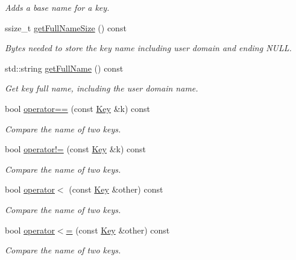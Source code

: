 \begin{DoxyCompactItemize}
\begin{DoxyCompactList}\small\item\em Adds a base name for a key. \end{DoxyCompactList}\item 
ssize\+\_\+t \hyperlink{classkdb_1_1Key_a4b5c13b86402dffa0845a6044cd57b39}{get\+Full\+Name\+Size} () const 
\begin{DoxyCompactList}\small\item\em Bytes needed to store the key name including user domain and ending N\+U\+L\+L. \end{DoxyCompactList}\item 
std\+::string \hyperlink{classkdb_1_1Key_ab94686ea0b459e5a383942ec322d9c6e}{get\+Full\+Name} () const 
\begin{DoxyCompactList}\small\item\em Get key full name, including the user domain name. \end{DoxyCompactList}\item 
bool \hyperlink{classkdb_1_1Key_abaff8356eb91a6d3aed2b6d282269da2}{operator==} (const \hyperlink{classkdb_1_1Key}{Key} \&k) const 
\begin{DoxyCompactList}\small\item\em Compare the name of two keys. \end{DoxyCompactList}\item 
bool \hyperlink{classkdb_1_1Key_a313a84b686a72769ecf4c368a79d492c}{operator!=} (const \hyperlink{classkdb_1_1Key}{Key} \&k) const 
\begin{DoxyCompactList}\small\item\em Compare the name of two keys. \end{DoxyCompactList}\item 
bool \hyperlink{classkdb_1_1Key_aace409efd393ae21f08d333f45da2769}{operator$<$} (const \hyperlink{classkdb_1_1Key}{Key} \&other) const 
\begin{DoxyCompactList}\small\item\em Compare the name of two keys. \end{DoxyCompactList}\item 
bool \hyperlink{classkdb_1_1Key_a3b466f59870b989aa9ec41558bba4d19}{operator$<$=} (const \hyperlink{classkdb_1_1Key}{Key} \&other) const 
\begin{DoxyCompactList}\small\item\em Compare the name of two keys. \end{DoxyCompactList}\item 

\end{DoxyCompactItemize}
